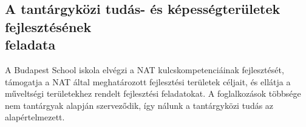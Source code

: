 
\hypertarget{a-tantargykozi-tudas--es-kepessegteruletek-fejlesztesenek-feladata}{%
\subsection{A tantárgyközi tudás- és képességterületek fejlesztésének\\
feladata}\label{a-tantargykozi-tudas--es-kepessegteruletek-fejlesztesenek-feladata}}

A Budapest School iskola elvégzi a NAT kulcskompetenciáinak
fejlesztését, támogatja a NAT által meghatározott fejlesztési területek
céljait, és ellátja a műveltségi területekhez rendelt fejlesztési
feladatokat. A foglalkozások többsége nem tantárgyak alapján
szerveződik, így nálunk a tantárgyközi tudás az alapértelmezett.
